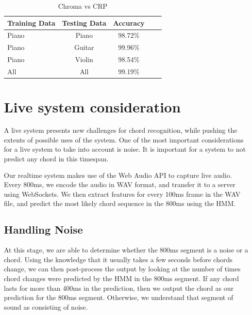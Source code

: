 \documentclass{article}
\begin{document}
\begin{table}[t]
\caption{Chroma vs CRP}
\label{chromavscrp}
\vskip 0.15in
\begin{center}
\begin{small}
\begin{sc}
\begin{tabular}{lcccr}
\hline
\abovespace\belowspace
Training Data & Testing Data & Accuracy \\
\hline
\abovespace
Piano & Piano & 98.72\%\\
Piano & Guitar & 99.96\%\\
Piano & Violin & 98.54\%\\
All & All & 99.19\%\\
\hline
\end{tabular}
\end{sc}
\end{small}
\end{center}
\vskip -0.1in
\end{table}

\section{Live system consideration}

A live system presents new challenges for chord recognition, while pushing the
extents of possible uses of the system.
One of the most important considerations for a live system to take into account
is noise. It is important for a system to not predict any chord in this
timespan.

Our realtime system makes use of the Web Audio API to capture live audio. Every
800ms, we encode the audio in WAV format, and transfer it to a server using
WebSockets. We then extract features for every 100ms frame in the WAV file, and
predict the most likely chord sequence in the 800ms using the HMM.

\subsection{Handling Noise}
At this stage, we are able to determine whether the 800ms segment is a noise or
a chord. Using the knowledge that it usually takes a few seconds before chords
change, we can then post-process the output by looking at the number of times
chord changes were predicted by the HMM in the 800ms segment. If any chord lasts
for more than 400ms in the prediction, then we output the chord as our
prediction for the 800ms segment. Otherwise, we understand that segment of sound
as consisting of noise.
\end{document}
